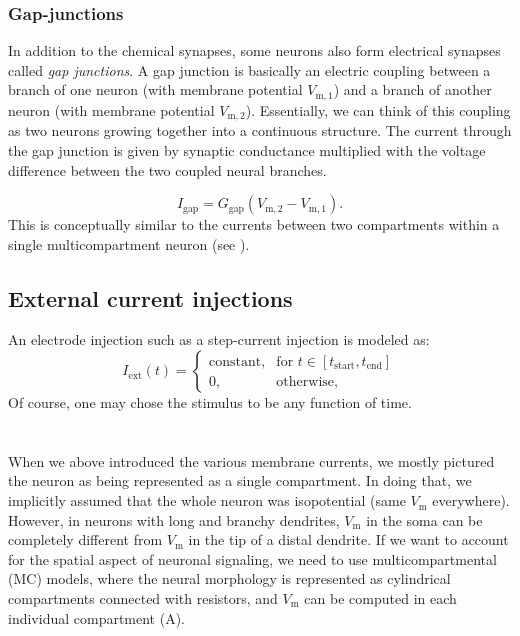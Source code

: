 

\subsubsection{Gap-junctions}
In addition to the chemical synapses, some neurons also form electrical synapses called \textit{gap junctions}. A gap junction is basically an electric coupling between a branch of one neuron (with membrane potential $V_\mathrm{m,1}$) and a branch of another neuron (with membrane potential $V_\mathrm{m,2}$). Essentially, we can think of this coupling as two neurons growing together into a continuous structure. The current through the gap junction is given by synaptic conductance multiplied with the voltage difference between the two coupled neural branches. 

\begin{equation}
I_\text{gap}=G_\text{gap} (V_\mathrm{m,2}-V_\mathrm{m,1}).
\label{eq:Neuron:gapjunction}
\end{equation}
This is conceptually similar to the currents between two compartments within a single multicompartment neuron (see ).


\subsection{External current injections}
An electrode injection such as a step-current injection is modeled as:
\begin{equation}
I_\text{ext}(t)= 
\begin{cases}
    \text{constant}, & \text{for } t \in [t_\mathrm{start}, t_\mathrm{end}] \\
    0,              & \text{otherwise},
\end{cases}
\label{eq:Neuron:injected}
\end{equation}
Of course, one may chose the stimulus to be any function of time.



\section{}
\label{sec:Neuron:morphology}
When we above introduced the various membrane currents, we mostly pictured the neuron as being represented as a single compartment. In doing that, we implicitly assumed that the whole neuron was isopotential (same $V_\mathrm{m}$ everywhere). However, in neurons with long and branchy dendrites, $V_\mathrm{m}$ in the soma can be completely different from $V_\mathrm{m}$ in the tip of a distal dendrite. If we want to account for the spatial aspect of neuronal signaling, we need to use multicompartmental (MC) models, where the neural morphology is represented as cylindrical compartments connected with resistors, and $V_\mathrm{m}$ can be computed in each individual compartment (A). 

